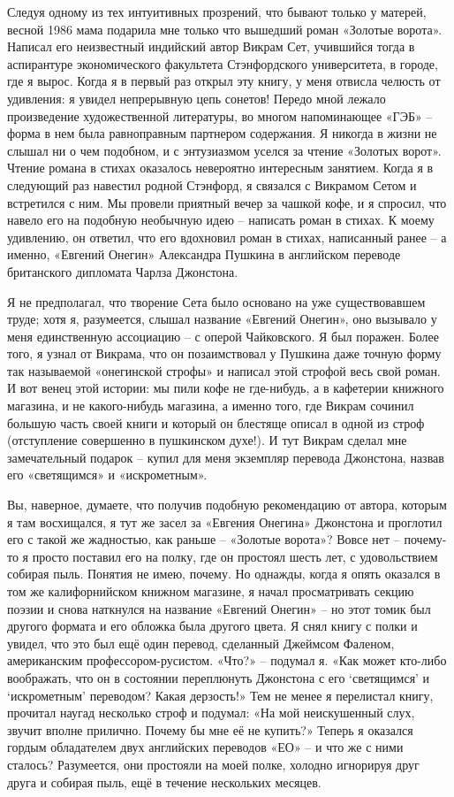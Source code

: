 \documentclass[../main.tex]{subfiles}
\begin{document}
Следуя одному из тех интуитивных прозрений, что бывают только у матерей, весной 1986 мама подарила мне только что вышедший роман «Золотые ворота». Написал его неизвестный индийский автор Викрам Сет, учившийся тогда в аспирантуре экономического факультета Стэнфордского университета, в городе, где я вырос. Когда я в первый раз открыл эту книгу, у меня отвисла челюсть от удивления: я увидел непрерывную цепь сонетов! Передо мной лежало произведение художественной литературы, во многом напоминающее «ГЭБ» \--- форма в нем была равноправным партнером содержания. Я никогда в жизни не слышал ни о чем подобном, и с энтузиазмом уселся за чтение «Золотых ворот». Чтение романа в стихах оказалось невероятно интересным занятием. Когда я в следующий раз навестил родной Стэнфорд, я связался с Викрамом Сетом и встретился с ним. Мы провели приятный вечер за чашкой кофе, и я спросил, что навело его на подобную необычную идею \--- написать роман в стихах. К моему удивлению, он ответил, что его вдохновил роман в стихах, написанный ранее \--- а именно, «Евгений Онегин» Александра Пушкина в английском переводе британского дипломата Чарлза Джонстона.

Я не предполагал, что творение Сета было основано на уже существовавшем труде; хотя я, разумеется, слышал название «Евгений Онегин», оно вызывало у меня единственную ассоциацию \--- с оперой Чайковского. Я был поражен. Более того, я узнал от Викрама, что он позаимствовал у Пушкина даже точную форму так называемой «онегинской строфы» и написал этой строфой весь свой роман. И вот венец этой истории: мы пили кофе не где-нибудь, а в кафетерии книжного магазина, и не какого-нибудь магазина, а именно того, где Викрам сочинил большую часть своей книги и который он блестяще описал в одной из строф (отступление совершенно в пушкинском духе!). И тут Викрам сделал мне замечательный подарок \--- купил для меня экземпляр перевода Джонстона, назвав его «светящимся» и «искрометным».

Вы, наверное, думаете, что получив подобную рекомендацию от автора, которым я там восхищался, я тут же засел за «Евгения Онегина» Джонстона и проглотил его с такой же жадностью, как раньше \--- «Золотые ворота»? Вовсе нет \--- почему-то я просто поставил его на полку, где он простоял шесть лет, с удовольствием собирая пыль. Понятия не имею, почему. Но однажды, когда я опять оказался в том же калифорнийском книжном магазине, я начал просматривать секцию поэзии и снова наткнулся на название «Евгений Онегин» \--- но этот томик был другого формата и его обложка была другого цвета. Я снял книгу с полки и увидел, что это был ещё один перевод, сделанный Джеймсом Фаленом, американским профессором-русистом. «Что?» \--- подумал я. «Как может кто-либо воображать, что он в состоянии переплюнуть Джонстона с его \enquote*{светящимся} и \enquote*{искрометным} переводом? Какая дерзость!» Тем не менее я перелистал книгу, прочитал наугад несколько строф и подумал: «На мой неискушенный слух, звучит вполне прилично. Почему бы мне её не купить?» Теперь я оказался гордым обладателем двух английских переводов «ЕО» \--- и что же с ними сталось? Разумеется, они простояли на моей полке, холодно игнорируя друг друга и собирая пыль, ещё в течение нескольких месяцев.
\end{document}
